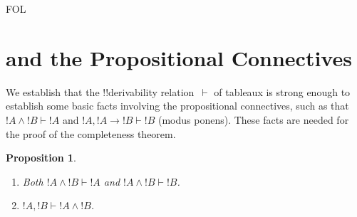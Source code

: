 \documentclass[10pt,a4paper]{article}
\theoremstyle{plain}
\newtheorem{prop}[thm]{Proposition}
\theoremstyle{definition}
\theoremstyle{remark}
\newenvironment{explain}{}{}
\newcommand*{\olfileid}[3]{}
\newcommand*{\olsection}[1]{\section*{#1}}
\newcommand*{\ollabel}[1]{\label{#1}}
\providecommand{\lif}{\mathbin{\rightarrow}}
\providecommand{\Proves}{\mathrel{\vdash}}
\providecommand{\iftag}[1]{#1}
\providecommand{\iftag}{}
\begin{document}




\iftag{FOL}
      {\olfileid{fol}{tab}{ppr}}
      {\olfileid{pl}{tab}{ppr}}

\olsection{ and the Propositional Connectives}

\begin{explain}
  We establish that the !!{derivability} relation~$\Proves$ of
  tableaux is strong enough to establish some basic facts involving
  the propositional connectives, such as that $!A \land !B \Proves !A$
  and $!A, !A \lif !B \Proves !B$ (modus ponens). These facts are
  needed for the proof of the completeness theorem.
\end{explain}

\begin{prop}\ollabel{prop:provability-land}
  \begin{enumerate}
  \item \ollabel{prop:provability-land-left} Both $!A \land !B \Proves
    !A$ and $!A \land !B \Proves !B$.
  \item \ollabel{prop:provability-land-right} $!A, !B \Proves !A \land
    !B$.
  \end{enumerate}
\end{prop}
\end{document}
